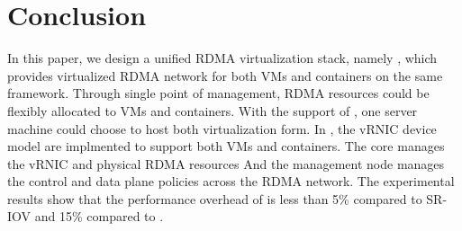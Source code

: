 \section{Conclusion} \label{conclusion}
In this paper, we design a unified RDMA virtualization stack, namely \sys, which provides virtualized RDMA network for both VMs and containers on the same framework.
Through single point of management, RDMA resources could be flexibly allocated to VMs and containers. With the support of \sys, one server machine could choose to host both virtualization form.
In \sys, the vRNIC device model are implmented to support both VMs and containers. The \sys core manages the vRNIC and physical RDMA resources And the management node manages the control and data plane policies across the RDMA network. The experimental results show that the performance overhead of \sys is less than 5\% compared to SR-IOV and 15\% compared to \native.